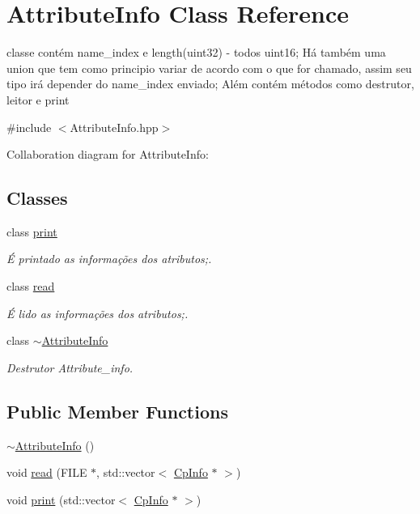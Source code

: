 \hypertarget{class_attribute_info}{}\section{Attribute\+Info Class Reference}
\label{class_attribute_info}


classe contém name\+\_\+index e length(uint32) -\/ todos uint16; Há também uma union que tem como principio variar de acordo com o que for chamado, assim seu tipo irá depender do name\+\_\+index enviado; Além contém métodos como destrutor, leitor e print  




{\ttfamily \#include $<$Attribute\+Info.\+hpp$>$}



Collaboration diagram for Attribute\+Info\+:
\subsection*{Classes}
\begin{DoxyCompactItemize}
\item 
class \hyperlink{class_attribute_info_1_1print}{print}
\begin{DoxyCompactList}\small\item\em É printado as informações dos atributos;. \end{DoxyCompactList}\item 
class \hyperlink{class_attribute_info_1_1read}{read}
\begin{DoxyCompactList}\small\item\em É lido as informações dos atributos;. \end{DoxyCompactList}\item 
class \hyperlink{class_attribute_info_1_1~_attribute_info}{$\sim$\+Attribute\+Info}
\begin{DoxyCompactList}\small\item\em Destrutor Attribute\+\_\+info. \end{DoxyCompactList}\end{DoxyCompactItemize}
\subsection*{Public Member Functions}
\begin{DoxyCompactItemize}
\item 
\hyperlink{class_attribute_info_a162f3e7ddffe46e9f49c16d801b8a801}{$\sim$\+Attribute\+Info} ()
\item 
void \hyperlink{class_attribute_info_ac167daa272a7ef9b9f11389d34e42165}{read} (F\+I\+LE $\ast$, std\+::vector$<$ \hyperlink{class_cp_info}{Cp\+Info} $\ast$ $>$)
\item 
void \hyperlink{class_attribute_info_ab9d036b005950e243e6375d49a533d58}{print} (std\+::vector$<$ \hyperlink{class_cp_info}{Cp\+Info} $\ast$ $>$)
\end{DoxyCompactItemize}

